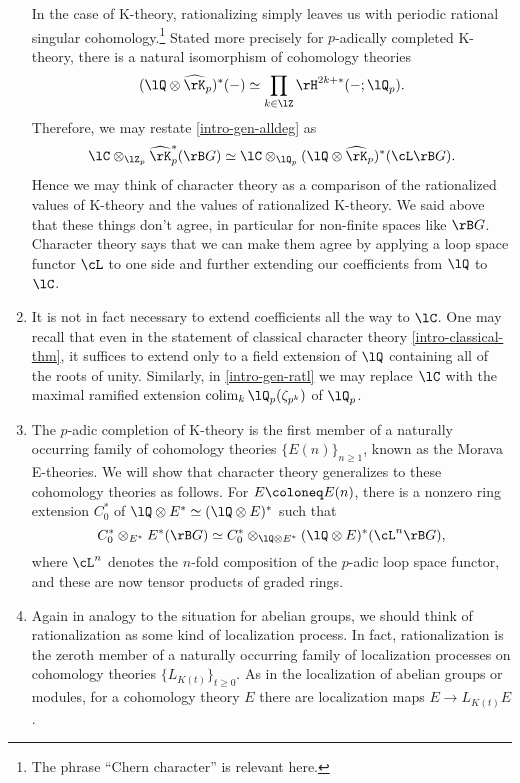 \begin{nothing}
\begin{enumerate}[leftmargin=*]
    In the case of K-theory, rationalizing simply leaves us with
    periodic rational singular cohomology.\footnote{The phrase ``Chern
      character'' is relevant here.} Stated more precisely for
    $p$-adically completed K-theory, there is a natural isomorphism of
    cohomology theories
    \[
    (\lQ \otimes \hat\rK_p)^*(-) \iso \prod_{k \in \lZ}
    \rH^{2k+*}(-;\lQ_p).
    \]
    Therefore, we may restate \cref{intro-gen-alldeg} as
    \begin{equation}
      \label{intro-gen-ratl}
      \lC \otimes_{\lZ_p} \hat\rK_p^*(\rB G) \iso
      \lC \otimes_{\lQ_p} (\lQ \otimes \hat\rK_p)^*(\cL\rB G).
    \end{equation}
    Hence we may think of character theory as a comparison of the
    rationalized values of K-theory and the values of rationalized
    K-theory. We said above that these things don't agree, in
    particular for non-finite spaces like $\rB G$. Character theory
    says that we can make them agree by applying a loop space functor
    $\cL$ to one side and further extending our coefficients from
    $\lQ$ to $\lC$.

  \item It is not in fact necessary to extend coefficients all the way
    to $\lC$. One may recall that even in the statement of classical
    character theory \cref{intro-classical-thm}, it suffices to extend
    only to a field extension of $\lQ$ containing all of the roots of
    unity. Similarly, in \cref{intro-gen-ratl} we may replace $\lC$
    with the maximal ramified extension $\colim_k \lQ_p(\zeta_{p^k})$
    of $\lQ_p$.

  \item The $p$-adic completion of K-theory is the first member of a
    naturally occurring family of cohomology theories
    $\{E(n)\}_{n \ge 1}$, known as the Morava E-theories. We will show
    that character theory generalizes to these cohomology theories as
    follows. For $E \ce E(n)$, there is a nonzero ring extension
    $C_0^*$ of $\lQ \otimes E^* \iso (\lQ \otimes E)^*$ such that
    \begin{equation}
      \label{intro-gen-ethy}
      C_0^* \otimes_{E^*} E^*(\rB G) \iso
      C_0^* \otimes_{\lQ \otimes E^*}
      (\lQ \otimes E)^*(\cL^n\rB G),
    \end{equation}
    where $\cL^n$ denotes the $n$-fold composition of the $p$-adic
    loop space functor, and these are now tensor products of graded
    rings.

  \item Again in analogy to the situation for abelian groups, we
    should think of rationalization as some kind of localization
    process. In fact, rationalization is the zeroth member of a
    naturally occurring family of localization processes on cohomology
    theories $\{L_{K(t)}\}_{t \ge 0}$. As in the localization of
    abelian groups or modules, for a cohomology theory $E$ there are
    localization maps $E \to L_{K(t)}E$.


\end{enumerate}
\end{nothing}
